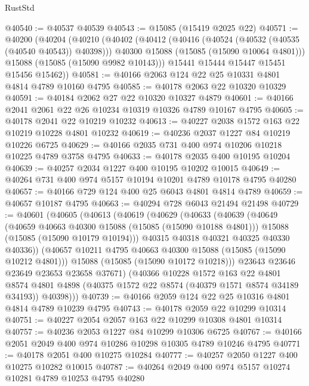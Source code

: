 \begin{lexlean}{RustStd}
\begin{coremodule}
@40540 := @40537 @40539
@40543 := @15085 (@15419 @2025 @22)
@40571 := @40200
    (@40204
      (@40210
        (@40402
          (@40412
            (@40416 (@40524 (@40532 (@40535 (@40540 @40543)) @40398)))
            @40300
            @15088
            (@15085 (@15090 @10064 @4801)))
          @15088
          (@15085 (@15090 @9982 @10143)))
        @15441
        @15444
        @15447
        @15451
        @15456
        @15462))
@40581 := @40166 @2063 @124 @22 @25 @10331 @4801 @4814 @4789 @10160 @4795
@40585 := @40178 @2063 @22 @10320 @10329
@40591 := @40184 @2062 @27 @22 @10320 @10327 @4879
@40601 := @40166 @2041 @2061 @22 @26 @10234 @10319 @10326 @4789 @10167 @4795
@40605 := @40178 @2041 @22 @10219 @10232
@40613 := @40227 @2038 @1572 @163 @22 @10219 @10228 @4801 @10232
@40619 := @40236 @2037 @1227 @84 @10219 @10226 @6725
@40629 := @40166 @2035 @731 @400 @974 @10206 @10218 @10225 @4789 @3758 @4795
@40633 := @40178 @2035 @400 @10195 @10204
@40639 := @40257 @2034 @1227 @400 @10195 @10202 @10015
@40649 := @40264 @731 @400 @974 @5157 @10194 @10201 @4789 @10178 @4795 @40280
@40657 := @40166 @729 @124 @400 @25 @6043 @4801 @4814 @4789
@40659 := @40657 @10187 @4795
@40663 := @40294 @728 @6043 @21494 @21498
@40729 := @40601
    (@40605
      (@40613
        (@40619
          (@40629
            (@40633
              (@40639
                (@40649
                  (@40659 @40663 @40300 @15088 (@15085 (@15090 @10188 @4801)))
                  @15088
                  (@15085 (@15090 @10179 @10194)))
                @40315
                @40318
                @40321
                @40325
                @40330
                @40336))
            (@40657 @10211 @4795 @40663 @40300 @15088 (@15085 (@15090 @10212 @4801)))
            @15088
            (@15085 (@15090 @10172 @10218)))
          @23643
          @23646
          @23649
          @23653
          @23658
          @37671)
        (@40366
          @10228
          @1572
          @163
          @22
          @4801
          @8574
          @4801
          @4898
          (@40375 @1572 @22 @8574 (@40379 @1571 @8574 @34189 @34193))
          @40398)))
@40739 := @40166 @2059 @124 @22 @25 @10316 @4801 @4814 @4789 @10239 @4795
@40743 := @40178 @2059 @22 @10299 @10314
@40751 := @40227 @2054 @2057 @163 @22 @10299 @10308 @4801 @10314
@40757 := @40236 @2053 @1227 @84 @10299 @10306 @6725
@40767 := @40166 @2051 @2049 @400 @974 @10286 @10298 @10305 @4789 @10246 @4795
@40771 := @40178 @2051 @400 @10275 @10284
@40777 := @40257 @2050 @1227 @400 @10275 @10282 @10015
@40787 := @40264 @2049 @400 @974 @5157 @10274 @10281 @4789 @10253 @4795 @40280

\end{coremodule}
\end{lexlean}
